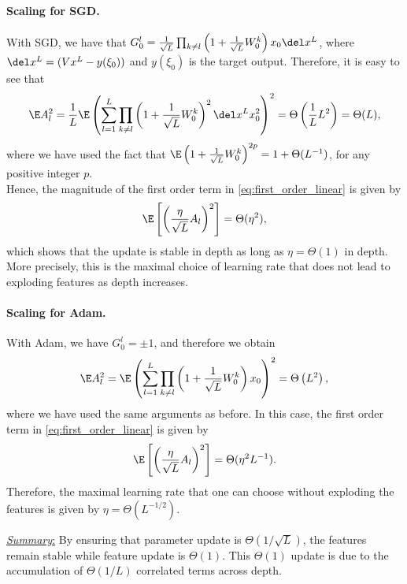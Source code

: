 \paragraph{Scaling for SGD.} With SGD,  we have that $G^l_0 = \frac{1}{\sqrt{L}} \prod_{k \neq l} \left(1 + \frac{1}{\sqrt{L}} W^k_0\right) x_0 \del x^L$, where $\del x^L = (V x^L - y(\xi_0))$ and $y(\xi_0)$ is the target output. 
Therefore, it is easy to see that 
\begin{align*}
\E A_l^2 = \frac{1}{L} \E \left(\sum_{l=1}^L \prod_{k \neq l}\left(1 + \frac{1}{\sqrt{L}} W^k_0\right)^2 \del x^L x_0^2 \right)^2 = \Theta\left(\frac{1}{L} L^2\right) = \Theta(L),
\end{align*}
where we have used the fact that $\E\left(1 + \frac{1}{\sqrt{L}} W^k_0\right)^{2p} = 1 + \Theta(L^{-1})$, for any positive integer $p$.\\

Hence, the magnitude of the first order term in \cref{eq:first_order_linear} is given by 
$$
\E\left[ \left(\frac{\eta}{\sqrt{L}} A_l\right)^2\right] = \Theta(\eta^2),
$$
which shows that the update is stable in depth as long as $\eta = \Theta(1)$ in depth. More precisely, this is the maximal choice of learning rate that does not lead to exploding features as depth increases.

\paragraph{Scaling for Adam.} With Adam, we have $G^l_0 = \pm 1$, and therefore we obtain
\begin{align*}
\E A_l^2 =  \E \left(\sum_{l=1}^L \prod_{k \neq l}\left(1 + \frac{1}{\sqrt{L}} W^k_0\right) x_0 \right)^2 = \Theta\left(L^2\right),
\end{align*}
where we have used the same arguments as before. In this case, the first order term in \cref{eq:first_order_linear} is given by
$$
\E\left[ \left(\frac{\eta}{\sqrt{L}} A_l\right)^2\right] = \Theta(\eta^2 L^{-1}).
$$
Therefore, the maximal learning rate that one can choose without exploding the features is given by $\eta = \Theta(L^{-1/2})$.

\underline{\textit{Summary}:} By ensuring that parameter update is $\Theta(1/\sqrt{L})$, the features remain stable while feature update is $\Theta(1)$. This $\Theta(1)$ update is due to the accumulation of $\Theta(1/L)$ correlated terms across depth.


